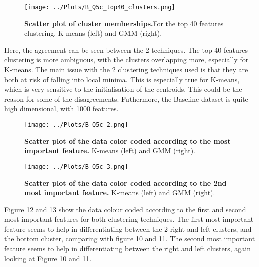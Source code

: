 \documentclass[12pt]{report} %
\begin{document}
\begin{figure}[htbp]
    \centering
    \texttt{[image: ../Plots/B\_Q5c\_top40\_clusters.png]}
    \caption{\textbf{Scatter plot of cluster memberships.}For the top 40 features clustering. K-means (left) and GMM (right).}
\end{figure}

Here, the agreement can be seen between the 2 techniques. The top 40 features clustering is more ambiguous, with the clusters overlapping more, especially for K-means. The main issue with the 2 clustering techniques used is that they are both at risk of falling into local minima. This is especially true for K-means, which is very sensitive to the initialisation of the centroids\cite[p. 263]{sklearn_book}. This could be the reason for some of the disagreements. Futhermore, the Baseline dataset is quite high dimensional, with 1000 features.  

\begin{figure}[htbp]
    \centering
    \texttt{[image: ../Plots/B\_Q5c\_2.png]}
    \caption{\textbf{Scatter plot of the data color coded according to the most important feature.} K-means (left) and GMM (right).}
\end{figure}


\begin{figure}[htbp]
    \centering
    \texttt{[image: ../Plots/B\_Q5c\_3.png]}
    \caption{\textbf{Scatter plot of the data color coded according to the 2nd most important feature.} K-means (left) and GMM (right).}
\end{figure}

Figure 12 and 13 show the data colour coded according to the first and second most important features for both clustering techniques. The first most important feature seems to help in differentiating between the 2 right and left clusters, and the bottom cluster, comparing with figure 10 and 11. The second most important feature seems to help in differentiating between the right and left clusters, again looking at Figure 10 and 11.




\end{document}
